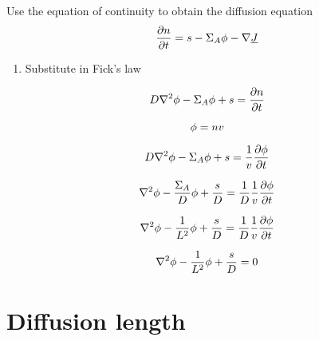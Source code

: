\documentclass[aspectratio=1610,pdftex,dvipsnames,compress,xcolor={dvipsnames}]{beamer}
\begin{document}
\addtocounter{framenumber}{-3} 
\begin{frame}{Use the equation of continuity to obtain the diffusion equation}
    \begin{equation}
        \small
        \frac{\partial{n}}{\partial{t}} = s - \Sigma_A \phi - \nabla \underline{J}
    \end{equation}

    \begin{enumerate}[series=outerlist,topsep=0pt,itemsep=21pt,leftmargin=*,label=(\arabic*)]
        \item[]Substitute in Fick's law
    \end{enumerate}

    \vspace*{\fill}

    \begin{equation}
        \small
        D \nabla^2 \phi - \Sigma_A \phi + s = \frac{\partial{n}}{\partial{t}}
    \end{equation}

    \vspace*{\fill}

    \begin{equation}
        \small
        \phi = nv
    \end{equation}

    \begin{equation}
        \small
        D \nabla^2 \phi - \Sigma_A \phi + s = \frac{1}{v} \frac{\partial{\phi}}{\partial{t}}
    \end{equation}

    \begin{equation}
        \small
        \nabla^2 \phi - \frac{\Sigma_A}{D} \phi + \frac{s}{D} = \frac{1}{D} \frac{1}{v} \frac{\partial{\phi}}{\partial{t}}
    \end{equation}

    \begin{equation}
        \small
        \nabla^2 \phi - \frac{1}{L^2} \phi + \frac{s}{D} = \frac{1}{D} \frac{1}{v} \frac{\partial{\phi}}{\partial{t}}
    \end{equation}

    \begin{equation}
        \small
        \nabla^2 \phi - \frac{1}{L^2} \phi + \frac{s}{D} = 0
    \end{equation}
\end{frame}


\section{Diffusion length}
\end{document}
